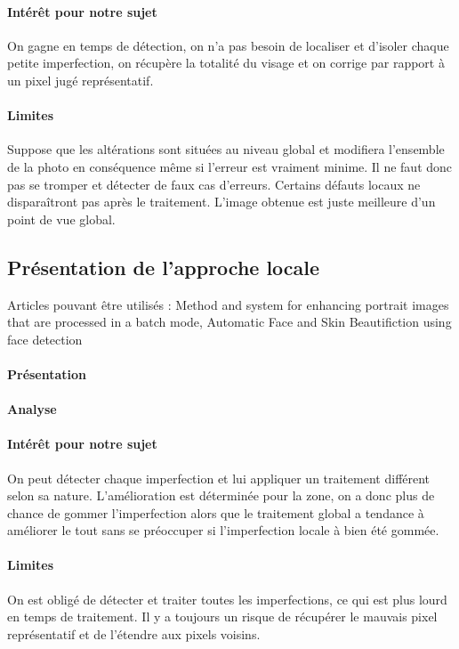 \documentclass[11pt, french]{report-rd-info}
\begin{document}
\paragraph{Intérêt pour notre sujet }
On gagne en temps de détection, on n’a pas besoin de localiser et d’isoler chaque petite imperfection, on récupère la totalité du visage et on corrige par rapport à un pixel jugé représentatif.

\paragraph{Limites }
Suppose que les altérations sont situées au niveau global et modifiera l’ensemble de la photo en conséquence même si l’erreur est vraiment minime. Il ne faut donc pas se tromper et détecter de faux cas d’erreurs. Certains défauts locaux ne disparaîtront pas après le traitement. L’image obtenue est juste meilleure d’un point de vue global.

\subsection{Présentation de l’approche locale}
Articles pouvant être utilisés : Method and system for enhancing portrait images that are processed in a batch mode, Automatic Face and Skin Beautifiction using face detection

\paragraph{Présentation }

\paragraph{Analyse }

\paragraph{Intérêt pour notre sujet }
On peut détecter chaque imperfection et lui appliquer un traitement différent selon sa nature. L’amélioration est déterminée pour la zone, on a donc plus de chance de gommer l’imperfection alors que le traitement global a tendance à améliorer le tout sans se préoccuper si l’imperfection locale à bien été gommée.

\paragraph{Limites }
On est obligé de détecter et traiter toutes les imperfections, ce qui est plus lourd en temps de traitement.
Il y a toujours un risque de récupérer le mauvais pixel représentatif et de l’étendre aux pixels voisins.
\end{document}
